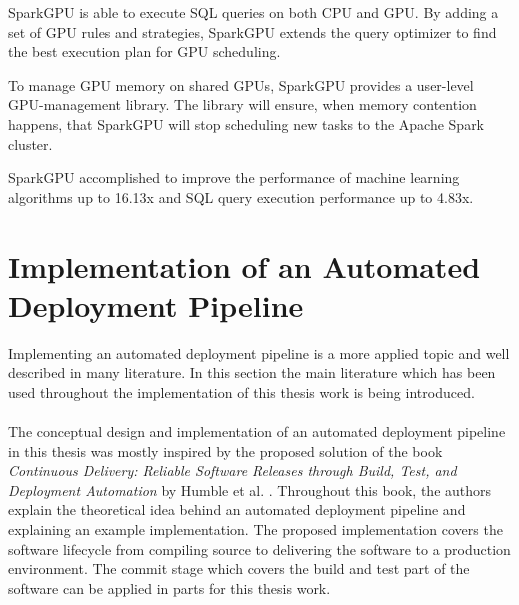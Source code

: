 SparkGPU is able to execute SQL queries on both CPU and GPU.
By adding a set of GPU rules and strategies, SparkGPU extends the query optimizer to find the best execution plan for GPU scheduling.

To manage GPU memory on shared GPUs, SparkGPU provides a user-level GPU-management library.
The library will ensure, when memory contention happens, that SparkGPU will stop scheduling new tasks to the Apache Spark cluster.

SparkGPU accomplished to improve the performance of machine learning algorithms up to 16.13x and SQL query execution performance up to 4.83x.


\section{Implementation of an Automated Deployment Pipeline}
Implementing an automated deployment pipeline is a more applied topic and well described in many literature. In this section the main literature which has been used throughout the implementation of this thesis work is being introduced.


\paragraph{}The conceptual design and implementation of an automated deployment pipeline in this thesis was mostly inspired by the proposed solution of the book \textit{Continuous Delivery: Reliable Software Releases through Build, Test, and Deployment Automation} by Humble et al. \cite{Farley2010CI}.
Throughout this book, the authors explain the theoretical idea behind an automated deployment pipeline and explaining an example implementation.
The proposed implementation covers the software lifecycle from compiling source to delivering the software to a production environment.
The commit stage which covers the build and test part of the software can be applied in parts for this thesis work.
